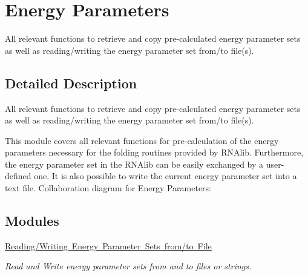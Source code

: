 \hypertarget{group__energy__parameters}{}\section{Energy Parameters}
\label{group__energy__parameters}


All relevant functions to retrieve and copy pre-\/calculated energy parameter sets as well as reading/writing the energy parameter set from/to file(s).  




\subsection{Detailed Description}
All relevant functions to retrieve and copy pre-\/calculated energy parameter sets as well as reading/writing the energy parameter set from/to file(s). 

This module covers all relevant functions for pre-\/calculation of the energy parameters necessary for the folding routines provided by R\+N\+Alib. Furthermore, the energy parameter set in the R\+N\+Alib can be easily exchanged by a user-\/defined one. It is also possible to write the current energy parameter set into a text file. Collaboration diagram for Energy Parameters\+:
\subsection*{Modules}
\begin{DoxyCompactItemize}
\item 
\mbox{\hyperlink{group__energy__parameters__rw}{Reading/\+Writing Energy Parameter Sets from/to File}}
\begin{DoxyCompactList}\small\item\em Read and Write energy parameter sets from and to files or strings. \end{DoxyCompactList}\end{DoxyCompactItemize}
